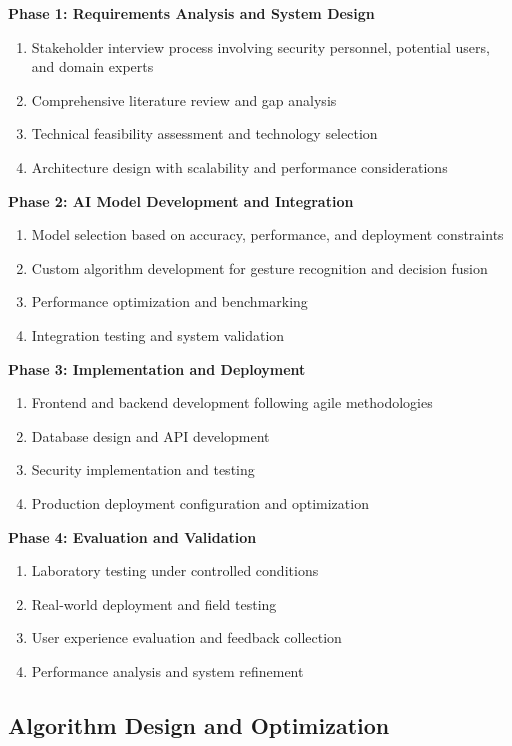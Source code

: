 \documentclass[12pt,a4paper]{article}
\begin{document}
\textbf{Phase 1: Requirements Analysis and System Design}
\begin{enumerate}
    \item Stakeholder interview process involving security personnel, potential users, and domain experts
    \item Comprehensive literature review and gap analysis
    \item Technical feasibility assessment and technology selection
    \item Architecture design with scalability and performance considerations
\end{enumerate}

\textbf{Phase 2: AI Model Development and Integration}
\begin{enumerate}
    \item Model selection based on accuracy, performance, and deployment constraints
    \item Custom algorithm development for gesture recognition and decision fusion
    \item Performance optimization and benchmarking
    \item Integration testing and system validation
\end{enumerate}

\textbf{Phase 3: Implementation and Deployment}
\begin{enumerate}
    \item Frontend and backend development following agile methodologies
    \item Database design and API development
    \item Security implementation and testing
    \item Production deployment configuration and optimization
\end{enumerate}

\textbf{Phase 4: Evaluation and Validation}
\begin{enumerate}
    \item Laboratory testing under controlled conditions
    \item Real-world deployment and field testing
    \item User experience evaluation and feedback collection
    \item Performance analysis and system refinement
\end{enumerate}

\subsection{Algorithm Design and Optimization}
\end{document}

